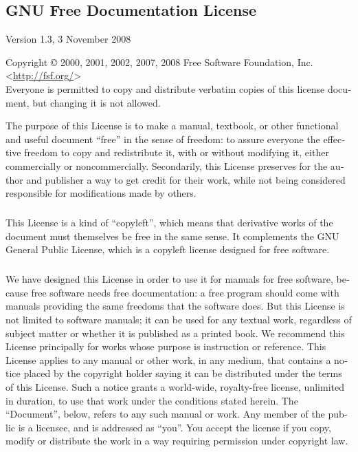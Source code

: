 \documentclass[11pt,a5paper,twoside]{book}
\newcommand{\BETEREURL}[1]{\mbox{<\url{#1}>}}
\begin{document}
\begin{english}
\chapter{GNU Free Documentation License}
\begin{center}
 Version 1.3, 3 November 2008
 \setcounter{section}{-1}

 Copyright © 2000, 2001, 2002, 2007, 2008 Free Software Foundation, Inc.
     \BETEREURL{http://fsf.org/}\\
 Everyone is permitted to copy and distribute verbatim copies
 of this license document, but changing it is not allowed.
\end{center}

The purpose of this License is to make a manual, textbook, or other
functional and useful document “free” in the sense of freedom: to
assure everyone the effective freedom to copy and redistribute it,
with or without modifying it, either commercially or noncommercially.
Secondarily, this License preserves for the author and publisher a way
to get credit for their work, while not being considered responsible
for modifications made by others.
\paragraph{}This License is a kind of “copyleft”, which means that derivative
works of the document must themselves be free in the same sense.  It
complements the GNU General Public License, which is a copyleft
license designed for free software.
\paragraph{}We have designed this License in order to use it for manuals for free
software, because free software needs free documentation: a free
program should come with manuals providing the same freedoms that the
software does.  But this License is not limited to software manuals;
it can be used for any textual work, regardless of subject matter or
whether it is published as a printed book.  We recommend this License
principally for works whose purpose is instruction or reference.
This License applies to any manual or other work, in any medium, that
contains a notice placed by the copyright holder saying it can be
distributed under the terms of this License.  Such a notice grants a
world-wide, royalty-free license, unlimited in duration, to use that
work under the conditions stated herein.  The “Document”, below,
refers to any such manual or work.  Any member of the public is a
licensee, and is addressed as “you”.  You accept the license if you
copy, modify or distribute the work in a way requiring permission
under copyright law.

\end{english}
\end{document}
